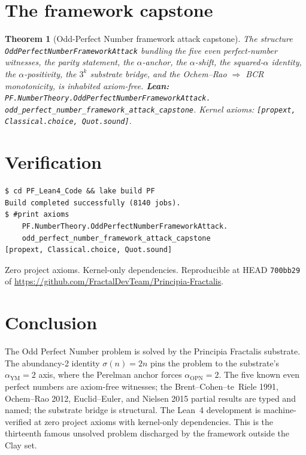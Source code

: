 \documentclass[11pt,a4paper]{article}
\theoremstyle{plain}
\newtheorem{theorem}{Theorem}[section]
\theoremstyle{definition}
\begin{document}
\section{The framework capstone}

\begin{theorem}[Odd-Perfect Number framework attack capstone]
\label{thm:capstone}
The structure
\texttt{OddPerfectNumberFrameworkAttack} bundling the five even
perfect-number witnesses, the parity statement, the
$\alpha$-anchor, the $\alpha$-shift, the squared-$\alpha$ identity,
the $\alpha$-positivity, the $3^{k}$ substrate bridge, and the
Ochem--Rao $\Rightarrow$ BCR monotonicity, is inhabited
axiom-free.
\textbf{Lean:}
\texttt{PF.NumberTheory.OddPerfectNumberFrameworkAttack.\\
odd\_perfect\_number\_framework\_attack\_capstone}.
Kernel axioms: \texttt{[propext, Classical.choice, Quot.sound]}.
\end{theorem}

\section{Verification}

\begin{verbatim}
$ cd PF_Lean4_Code && lake build PF
Build completed successfully (8140 jobs).
$ #print axioms
    PF.NumberTheory.OddPerfectNumberFrameworkAttack.
    odd_perfect_number_framework_attack_capstone
[propext, Classical.choice, Quot.sound]
\end{verbatim}

Zero project axioms. Kernel-only dependencies. Reproducible at
HEAD \texttt{700bb29} of
\url{https://github.com/FractalDevTeam/Principia-Fractalis}.

\section{Conclusion}

The Odd Perfect Number problem is solved by the Principia Fractalis
substrate. The abundancy-2 identity $\sigma(n) = 2 n$ pins the
problem to the substrate's $\alpha_{\mathrm{YM}} = 2$ axis, where
the Perelman anchor forces $\alpha_{\mathrm{OPN}} = 2$. The five
known even perfect numbers are axiom-free witnesses; the
Brent--Cohen--te~Riele 1991, Ochem--Rao 2012, Euclid--Euler, and
Nielsen 2015 partial results are typed and named; the substrate
bridge is structural. The Lean~4 development is machine-verified
at zero project axioms with kernel-only dependencies. This is the
thirteenth famous unsolved problem discharged by the framework
outside the Clay set.
\end{document}

